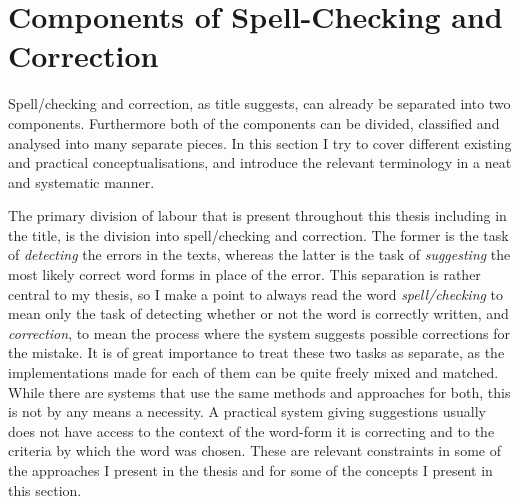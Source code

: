\documentclass[officiallayout]{unihelcompling}
\begin{document}
\section{Components of Spell-Checking and Correction}
\label{sec:practical-components}

Spell\-/checking and correction, as title suggests, can already be
separated into two components. Furthermore both of the components can be
divided, classified and analysed into many separate pieces. In this section I
try to cover different existing and practical conceptualisations, and introduce
the relevant terminology in a neat and systematic manner.

The primary division of labour that is present throughout this thesis including
in the title, is the division into spell\-/checking and correction. The former is
the task of \emph{detecting} the errors in the texts, whereas the latter is the
task of \emph{suggesting} the most likely correct word forms in place of the
error. This separation is rather central to my thesis, so I make a point to
always read the word \emph{spell\-/checking} to mean only the task of detecting
whether or not the word is correctly written, and \emph{correction}, to mean
the process where the system suggests possible corrections for the mistake.  It
is of great importance to treat these two tasks as separate, as the
implementations made for each of them can be quite freely mixed and matched.
While there are systems that use the same methods and approaches for both, this
is not by any means a necessity. A practical system giving suggestions usually
does not have access to the context of the word-form it is correcting and to
the criteria by which the word was chosen. These are relevant constraints in
some of the approaches I present in the thesis and for some of the concepts I
present in this section.
\end{document}
